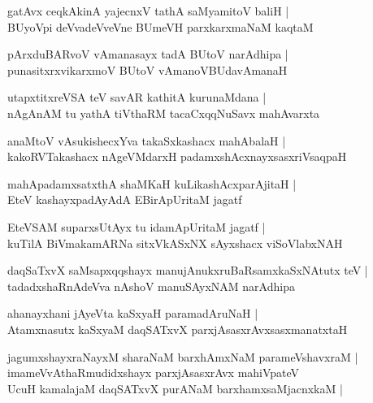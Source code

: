 \begin{shloka}
gatAvx ceqkAkinA yajecnxV tathA saMyamitoV baliH |\\ BUyoVpi deVvadeVveVne BUmeVH parxkarxmaNaM kaqtaM
\end{shloka}

\begin{shloka}
pArxduBARvoV vAmanasayx tadA BUtoV narAdhipa |\\ punasitxrxvikarxmoV BUtoV vAmanoVBUdavAmanaH 
\end{shloka}

\begin{shloka}
utapxtitxreVSA teV savAR kathitA kurunaMdana |\\
nAgAnAM tu yathA tiVthaRM tacaCxqqNuSavx mahAvarxta
\end{shloka}

\begin{shloka}
anaMtoV vAsukishecxYva takaSxkashacx mahAbalaH |\\ kakoRVTakashacx nAgeVMdarxH padamxshAcxnayxsasxriVsaqpaH
\end{shloka}

\begin{shloka}
mahApadamxsatxthA shaMKaH kuLikashAcxparAjitaH |\\
EteV kashayxpadAyAdA EBirApUritaM jagatf
\end{shloka}

\begin{shloka}
EteVSAM suparxsUtAyx tu idamApUritaM jagatf |\\ kuTilA BiVmakamARNa sitxVkASxNX sAyxshacx viSoVlabxNAH
\end{shloka}

\begin{shloka}
daqSaTxvX saMsapxqqshayx manujAnukxruBaRsamxkaSxNAtutx teV |\\ tadadxshaRnAdeVva nAshoV manuSAyxNAM narAdhipa
\end{shloka}

\begin{shloka}
ahanayxhani jAyeVta kaSxyaH paramadAruNaH |\\ Atamxnasutx kaSxyaM daqSATxvX parxjAsasxrAvxsasxmanatxtaH
\end{shloka}

\begin{shloka}
jagumxshayxraNayxM sharaNaM barxhAmxNaM parameVshavxraM |\\ imameVvAthaRmudidxshayx parxjAsasxrAvx mahiVpateV\\ UcuH kamalajaM daqSATxvX purANaM barxhamxsaMjacnxkaM |
\end{shloka}

